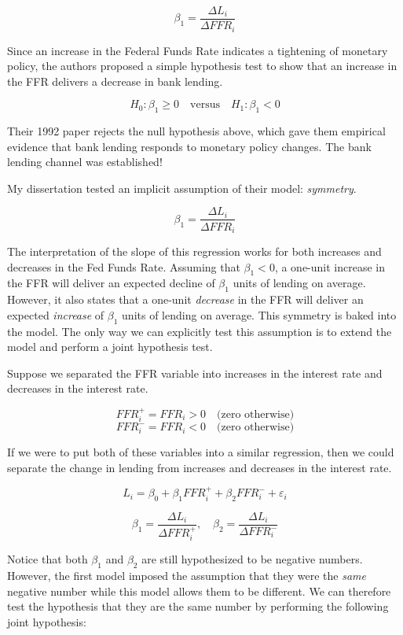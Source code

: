 \documentclass[
]{book}
\begin{document}
\[\beta_1 = \frac{\Delta L_i}{\Delta FFR_i}\]

Since an increase in the Federal Funds Rate indicates a tightening of monetary policy, the authors proposed a simple hypothesis test to show that an increase in the FFR delivers a decrease in bank lending.

\[H_0:\beta_1 \geq 0 \quad \text{versus} \quad H_1:\beta_1 < 0\]

Their 1992 paper rejects the null hypothesis above, which gave them empirical evidence that bank lending responds to monetary policy changes. The bank lending channel was established!

My dissertation tested an implicit assumption of their model: \emph{symmetry}.

\[\beta_1 = \frac{\Delta L_i}{\Delta FFR_i}\]

The interpretation of the slope of this regression works for both increases and decreases in the Fed Funds Rate. Assuming that \(\beta_1 <0\), a one-unit increase in the FFR will deliver an expected decline of \(\beta_1\) units of lending on average. However, it also states that a one-unit \emph{decrease} in the FFR will deliver an expected \emph{increase} of \(\beta_1\) units of lending on average. This symmetry is baked into the model. The only way we can explicitly test this assumption is to extend the model and perform a joint hypothesis test.

Suppose we separated the FFR variable into increases in the interest rate and decreases in the interest rate.

\[FFR_i^+ = FFR_i >0 \quad \text{(zero otherwise)}\]
\[FFR_i^- = FFR_i <0 \quad \text{(zero otherwise)}\]

If we were to put both of these variables into a similar regression, then we could separate the change in lending from increases and decreases in the interest rate.

\[L_i = \beta_0 + \beta_1 FFR_i^+ + \beta_2 FFR_i^- + \varepsilon_i\]

\[\beta_1 = \frac{\Delta L_i}{\Delta FFR_i^+}, \quad \beta_2 = \frac{\Delta L_i}{\Delta FFR_i^-}\]

Notice that both \(\beta_1\) and \(\beta_2\) are still hypothesized to be negative numbers. However, the first model imposed the assumption that they were the \emph{same} negative number while this model allows them to be different. We can therefore test the hypothesis that they are the same number by performing the following joint hypothesis:
\end{document}
